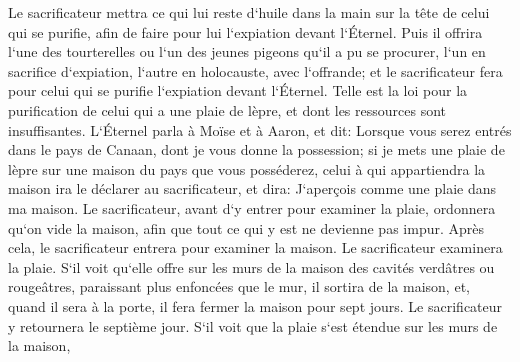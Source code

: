 \verse Le sacrificateur mettra ce qui lui reste d`huile dans la main sur la tête de celui qui se purifie, afin de faire pour lui l`expiation devant l`Éternel. 
\verse Puis il offrira l`une des tourterelles ou l`un des jeunes pigeons qu`il a pu se procurer, 
\verse l`un en sacrifice d`expiation, l`autre en holocauste, avec l`offrande; et le sacrificateur fera pour celui qui se purifie l`expiation devant l`Éternel. 
\verse Telle est la loi pour la purification de celui qui a une plaie de lèpre, et dont les ressources sont insuffisantes. 
\verse L`Éternel parla à Moïse et à Aaron, et dit: 
\verse Lorsque vous serez entrés dans le pays de Canaan, dont je vous donne la possession; si je mets une plaie de lèpre sur une maison du pays que vous posséderez, 
\verse celui à qui appartiendra la maison ira le déclarer au sacrificateur, et dira: J`aperçois comme une plaie dans ma maison. 
\verse Le sacrificateur, avant d`y entrer pour examiner la plaie, ordonnera qu`on vide la maison, afin que tout ce qui y est ne devienne pas impur. Après cela, le sacrificateur entrera pour examiner la maison. 
\verse Le sacrificateur examinera la plaie. S`il voit qu`elle offre sur les murs de la maison des cavités verdâtres ou rougeâtres, paraissant plus enfoncées que le mur, 
\verse il sortira de la maison, et, quand il sera à la porte, il fera fermer la maison pour sept jours. 
\verse Le sacrificateur y retournera le septième jour. S`il voit que la plaie s`est étendue sur les murs de la maison, 
